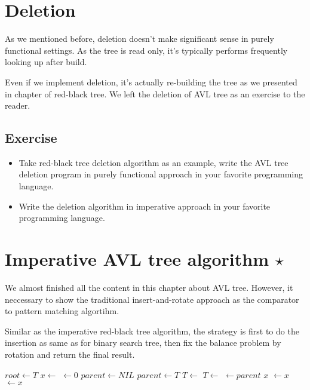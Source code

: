 \documentclass{article}
\begin{document}
 

\section{Deletion}

As we mentioned before, deletion doesn't make significant sense in
purely functional settings. As the tree is read only, it's typically
performs frequently looking up after build.

Even if we implement deletion, it's actually re-building the tree
as we presented in chapter of red-black tree. We left the deletion
of AVL tree as an exercise to the reader.

\subsection*{Exercise}
\begin{itemize}

\item Take red-black tree deletion algorithm as an example, write the 
AVL tree deletion program in purely functional approach in your
favorite programming language.

\item Write the deletion algorithm in imperative approach in your favorite
programming language.

\end{itemize}

\section{Imperative AVL tree algorithm $\star$}

We almost finished all the content in this chapter about AVL tree.
However, it neccessary to show the traditional insert-and-rotate
approach as the comparator to pattern matching algortihm.

Similar as the imperative red-black tree algorithm, the strategy
is first to do the insertion as same as for binary search tree,
then fix the balance problem by rotation and return the final result.

\begin{algorithmic}[1]
  \State $root \gets T$
  \State $x \gets$ 
  \State {} $\gets 0$
  \State $parent \gets NIL$
    \State $parent \gets T$
      \State $T \gets $ 
    \Else
      \State $T \gets $ 
    \EndIf
  \EndWhile
  \State {} $\gets parent$
   
    \State \Return $x$
    \State {} $\gets x$
  \Else
    \State {} $\gets x$
  \EndIf
  \State \Return {}
\EndFunction
\end{algorithmic}
\end{document}

